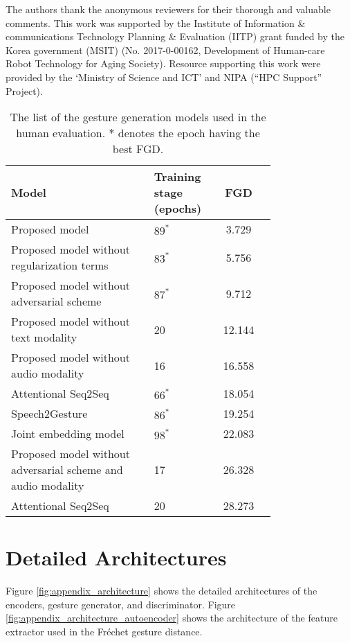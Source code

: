 \documentclass[acmtog]{acmart}
\begin{document}
\begin{acks}
The authors thank the anonymous reviewers for their thorough and valuable comments. This work was supported by the Institute of Information \& communications Technology Planning \& Evaluation (IITP) grant funded by the Korea government (MSIT) (No. 2017-0-00162, Development of Human-care Robot Technology for Aging Society). Resource supporting this work were provided by the `Ministry of Science and ICT' and NIPA (``HPC Support'' Project).
\end{acks} 



\appendix

\begin{table}
\caption{The list of the gesture generation models used in the human evaluation. $\ast$ denotes the epoch having the best FGD.}
\label{tab:ut_models}
\centering
\begin{tabular}{p{0.54\linewidth}p{0.22\linewidth}S}
  \toprule
  Model & Training stage (epochs) & {FGD}\\ 
  \midrule
Proposed model & $89^\ast$ & 3.729\\
Proposed model without regularization terms & $83^\ast$ & 5.756\\
Proposed model without adversarial scheme & $87^\ast$ & 9.712\\
Proposed model without text modality & 20 & 12.144\\
Proposed model without audio modality & 16 & 16.558\\
Attentional Seq2Seq & $66^\ast$ & 18.054\\
Speech2Gesture & $86^\ast$ & 19.254\\
Joint embedding model & $98^\ast$ & 22.083\\
Proposed model without adversarial scheme and audio modality & 17 & 26.328\\
Attentional Seq2Seq & 20 & 28.273\\
  \bottomrule
\end{tabular}
\end{table}

\section{Detailed Architectures} \label{sec:detailedarch}

Figure \ref{fig:appendix_architecture} shows the detailed architectures of the encoders, gesture generator, and discriminator. Figure \ref{fig:appendix_architecture_autoencoder} shows the architecture of the feature extractor used in the Fr\'{e}chet gesture distance.
\end{document}
